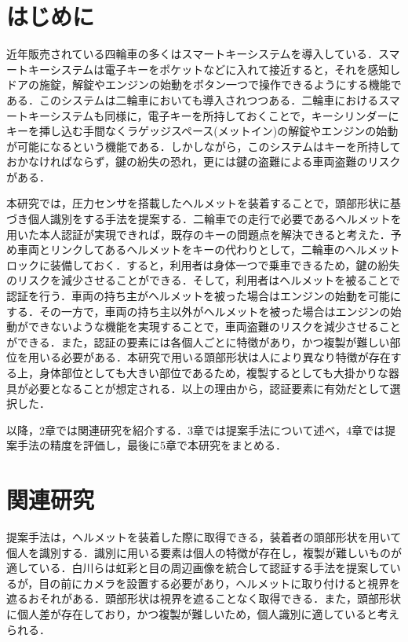 \documentclass[Japanese]{dicomopapers}
\begin{document}
\section{はじめに}
近年販売されている四輪車の多くはスマートキーシステムを導入している．スマートキーシステムは電子キーをポケットなどに入れて接近すると，それを感知しドアの施錠，解錠やエンジンの始動をボタン一つで操作できるようにする機能である．このシステムは二輪車においても導入されつつある．二輪車におけるスマートキーシステムも同様に，電子キーを所持しておくことで，キーシリンダーにキーを挿し込む手間なくラゲッジスペース(メットイン)の解錠やエンジンの始動が可能になるという機能である．しかしながら，このシステムはキーを所持しておかなければならず，鍵の紛失の恐れ，更には鍵の盗難による車両盗難のリスクがある．\par
本研究では，圧力センサを搭載したヘルメットを装着することで，頭部形状に基づき個人識別をする手法を提案する．二輪車での走行で必要であるヘルメットを用いた本人認証が実現できれば，既存のキーの問題点を解決できると考えた．予め車両とリンクしてあるヘルメットをキーの代わりとして，二輪車のヘルメットロックに装備しておく．すると，利用者は身体一つで乗車できるため，鍵の紛失のリスクを減少させることができる．そして，利用者はヘルメットを被ることで認証を行う．車両の持ち主がヘルメットを被った場合はエンジンの始動を可能にする．その一方で，車両の持ち主以外がヘルメットを被った場合はエンジンの始動ができないような機能を実現することで，車両盗難のリスクを減少させることができる．また，認証の要素には各個人ごとに特徴があり，かつ複製が難しい部位を用いる必要がある．本研究で用いる頭部形状は人により異なり特徴が存在する上，身体部位としても大きい部位であるため，複製するとしても大掛かりな器具が必要となることが想定される．以上の理由から，認証要素に有効だとして選択した．\par
以降，2章では関連研究を紹介する．3章では提案手法について述べ，4章では提案手法の精度を評価し，最後に5章で本研究をまとめる．

\section{関連研究}
提案手法は，ヘルメットを装着した際に取得できる，装着者の頭部形状を用いて個人を識別する．識別に用いる要素は個人の特徴が存在し，複製が難しいものが適している．白川らは虹彩と目の周辺画像を統合して認証する手法\cite{iris_eye}を提案しているが，目の前にカメラを設置する必要があり，ヘルメットに取り付けると視界を遮るおそれがある．頭部形状は視界を遮ることなく取得できる．また，頭部形状に個人差が存在しており，かつ複製が難しいため，個人識別に適していると考えられる．
\end{document}
